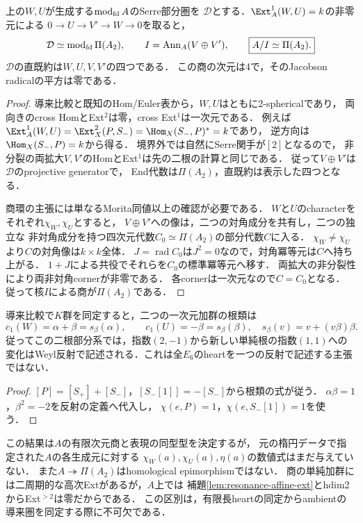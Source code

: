 \begin{theorem}[二つのcharacterが定める四次元商]
\label{thm:resonance-preprojective-quotient}
上の$W,U$が生成する$\operatorname{mod}_{\rm fd}A$のSerre部分圏を
$\mathcal D$とする．$\Ext_A^1(W,U)=k$の非零元による
$0\to U\to V'\to W\to0$を取ると，
\[
\mathcal D\simeq\operatorname{mod}_{\rm fd}\Pi(A_2),\qquad
I=\operatorname{Ann}_A(V\oplus V'),\qquad
\boxed{A/I\simeq\Pi(A_2).}
\]
$\mathcal D$の直既約は$W,U,V,V'$の四つである．
この商の次元は4で，そのJacobson radicalの平方は零である．
\end{theorem}
\begin{proof}
導来比較と既知のHom/Euler表から，$W,U$はともに2-sphericalであり，
両向きのcross HomとExt$^2$は零，cross Ext$^1$は一次元である．
例えば$\Ext_A^1(W,U)=\Ext_X^2(P,S_-)=\Hom_X(S_-,P)^*=k$であり，
逆方向は$\Hom_X(S_-,P)=k$から得る．
境界外では自然にSerre関手が$[2]$となるので，
非分裂の両拡大$V,V'$のHomとExt$^1$は先の二根の計算と同じである．
従って$V\oplus V'$は$\mathcal D$のprojective generatorで，
End代数は$\Pi(A_2)$，直既約は表示した四つとなる．

商環の主張には単なるMorita同値以上の確認が必要である．
$W$と$U$のcharacterをそれぞれ$\chi_W,\chi_U$とすると，
$V\oplus V'$への像は，二つの対角成分を共有し，二つの独立な
非対角成分を持つ四次元代数$C_0\simeq\Pi(A_2)$の部分代数$C$に入る．
$\chi_W\ne\chi_U$より$C$の対角像は$k\times k$全体．
$J=\operatorname{rad}C_0$は$J^2=0$なので，対角冪等元は$C$へ持ち上がる．
$1+J$による共役でそれらを$C_0$の標準冪等元へ移す．
両拡大の非分裂性により両非対角cornerが非零である．
各cornerは一次元なので$C=C_0$となる．
従って核$I$による商が$\Pi(A_2)$である．
\end{proof}
\begin{corollary}[二根部分系におけるWeyl反射]
\label{cor:resonance-weyl-reflection}
導来比較で$K$群を同定すると，二つの一次元加群の根類は
\[
c_1(W)=\alpha+\beta=s_\beta(\alpha),\qquad
c_1(U)=-\beta=s_\beta(\beta),
\quad s_\beta(v)=v+(v\beta)\beta.
\]
従ってこの二根部分系では，指数$(2,-1)$から新しい単純根の指数$(1,1)$への
変化はWeyl反射で記述される．これは全$E_6$のheartを一つの反射で記述する主張ではない．
\end{corollary}
\begin{proof}
$[P]=[S_+]+[S_-]$，$[S_-[1]]=-[S_-]$から根類の式が従う．
$\alpha\beta=1$，$\beta^2=-2$を反射の定義へ代入し，
$\chi(e,P)=1$，$\chi(e,S_-[1])=1$を使う．
\end{proof}

\begin{remark}[決定した表示と未計算の係数]
この結果は$A$の有限次元商と表現の同型型を決定するが，
元の楕円データで指定された$A$の各生成元に対する
$\chi_W(a),\chi_U(a),\eta(a)$の数値式はまだ与えていない．
また$A\twoheadrightarrow\Pi(A_2)$はhomological epimorphismではない．
商の単純加群には二周期的な高次Extがあるが，$A$上では
補題\ref{lem:resonance-affine-ext}とhdim2からExt$^{>2}$は零だからである．
この区別は，有限長heartの同定からambientの導来圏を同定する際に不可欠である．
\end{remark}
